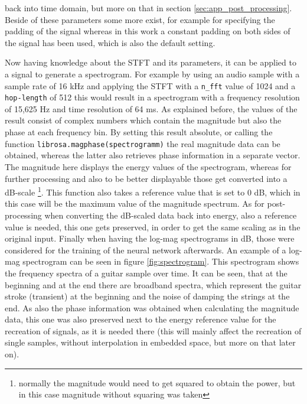 back into time domain, but more on that in section \ref{sec:app_post_processing}. Beside of these parameters some more exist, for example for specifying the padding of the signal whereas in this work a constant padding on both sides of the signal has been used, which is also the default setting.

Now having knowledge about the STFT and its parameters, it can be applied to a signal to generate a spectrogram. For example by using an audio sample with a sample rate of 16 kHz and applying the STFT with a \texttt{n\_fft} value of 1024 and a \texttt{hop-length} of 512 this would result in a spectrogram with a frequency resolution of 15,625 Hz and time resolution of 64 ms. As explained before, the values of the result consist of complex numbers which contain the magnitude but also the phase at each frequency bin. By setting this result absolute, or calling the function \texttt{librosa.magphase(spectrogramm)} the real magnitude data can be obtained, whereas the latter also retrieves phase information in a separate vector. The magnitude here displays the energy values of the spectrogram, whereas for further processing and also to be better displayable those get converted into a dB-scale \footnote{normally the magnitude would need to get squared to obtain the power, but in this case magnitude without squaring was taken}. This function also takes a reference value that is set to 0 dB, which in this case will be the maximum value of the magnitude spectrum. As for post-processing when converting the dB-scaled data back into energy, also a reference value is needed, this one gets preserved, in order to get the same scaling as in the original input. Finally when having the log-mag spectrograms in dB, those were considered for the training of the neural network afterwards. An example of a log-mag spectrogram can be seen in figure \ref{fig:spectrogram}. This spectrogram shows the frequency spectra of a guitar sample over time. It can be seen, that at the beginning and at the end there are broadband spectra, which represent the guitar stroke (transient) at the beginning and the noise of damping the strings at the end. As also the phase information was obtained when calculating the magnitude data, this one was also preserved next to the energy reference value for the recreation of signals, as it is needed there (this will mainly affect the recreation of single samples, without interpolation in embedded space, but more on that later on).


